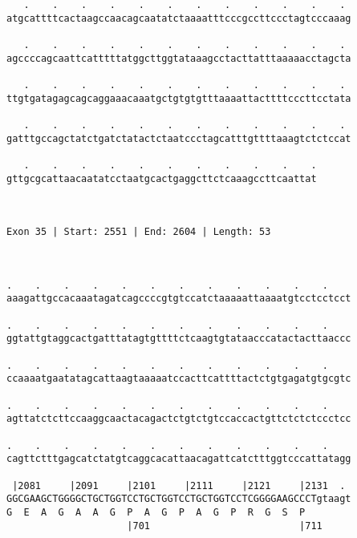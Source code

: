 \documentclass{article}
\begin{document}
\begin{Verbatim}
   .    .    .    .    .    .    .    .    .    .    .    . 
atgcattttcactaagccaacagcaatatctaaaatttcccgccttccctagtcccaaag
                                                            
   .    .    .    .    .    .    .    .    .    .    .    . 
agccccagcaattcatttttatggcttggtataaagcctacttatttaaaaacctagcta
                                                            
   .    .    .    .    .    .    .    .    .    .    .    . 
ttgtgatagagcagcaggaaacaaatgctgtgtgtttaaaattacttttcccttcctata
                                                            
   .    .    .    .    .    .    .    .    .    .    .    . 
gatttgccagctatctgatctatactctaatccctagcatttgttttaaagtctctccat
                                                            
   .    .    .    .    .    .    .    .    .    .    .
gttgcgcattaacaatatcctaatgcactgaggcttctcaaagccttcaattat
                                                      
                                                      
 
Exon 35 | Start: 2551 | End: 2604 | Length: 53



.    .    .    .    .    .    .    .    .    .    .    .    
aaagattgccacaaatagatcagccccgtgtccatctaaaaattaaaatgtcctcctcct
                                                            
.    .    .    .    .    .    .    .    .    .    .    .    
ggtattgtaggcactgatttatagtgttttctcaagtgtataacccatactacttaaccc
                                                            
.    .    .    .    .    .    .    .    .    .    .    .    
ccaaaatgaatatagcattaagtaaaaatccacttcattttactctgtgagatgtgcgtc
                                                            
.    .    .    .    .    .    .    .    .    .    .    .    
agttatctcttccaaggcaactacagactctgtctgtccaccactgttctctctccctcc
                                                            
.    .    .    .    .    .    .    .    .    .    .    .    
cagttctttgagcatctatgtcaggcacattaacagattcatctttggtcccattatagg
                                                            
 |2081     |2091     |2101     |2111     |2121     |2131  . 
GGCGAAGCTGGGGCTGCTGGTCCTGCTGGTCCTGCTGGTCCTCGGGGAAGCCCTgtaagt
G  E  A  G  A  A  G  P  A  G  P  A  G  P  R  G  S  P        
                     |701                          |711     
  

\end{Verbatim}
\end{document}
